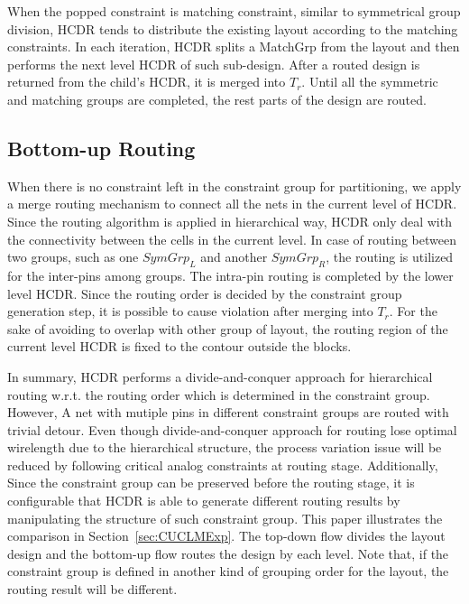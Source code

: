       When the popped constraint is matching constraint, similar to symmetrical group division, HCDR tends to distribute the existing layout according to the matching constraints. In each iteration, HCDR splits a MatchGrp from the layout and then performs the next level HCDR of such sub-design. After a routed design is returned from the child's HCDR, it is merged into $T_r$. Until all the symmetric and matching groups are completed, the rest parts of the design are routed.

    \subsection{Bottom-up Routing}\label{sec:HCDR_BtmUp}

      When there is no constraint left in the constraint group for partitioning, we apply a merge routing mechanism to connect all the nets in the current level of HCDR. Since the routing algorithm is applied in hierarchical way, HCDR only deal with the connectivity between the cells in the current level. In case of routing between two groups, such as one $SymGrp_L$ and another $SymGrp_R$, the routing is utilized for the inter-pins among groups. The intra-pin routing is completed by the lower level HCDR. Since the routing order is decided by the constraint group generation step, it is possible to cause violation after merging into $T_r$. For the sake of avoiding to overlap with other group of layout, the routing region of the current level HCDR is fixed to the contour outside the blocks. 

      In summary, HCDR performs a divide-and-conquer approach for hierarchical routing w.r.t. the routing order which is determined in the constraint group. However, A net with mutiple pins in different constraint groups are routed with trivial detour. Even though divide-and-conquer approach for routing lose optimal wirelength due to the hierarchical structure, the process variation issue will be reduced by following critical analog constraints at routing stage. Additionally, Since the constraint group can be preserved before the routing stage, it is configurable that HCDR is able to generate different routing results by manipulating the structure of such constraint group. This paper illustrates the comparison in Section~\ref{sec:CUCLMExp}. The top-down flow divides the layout design and the bottom-up flow routes the design by each level. Note that, if the constraint group is defined in another kind of grouping order for the layout, the routing result will be different.
  
